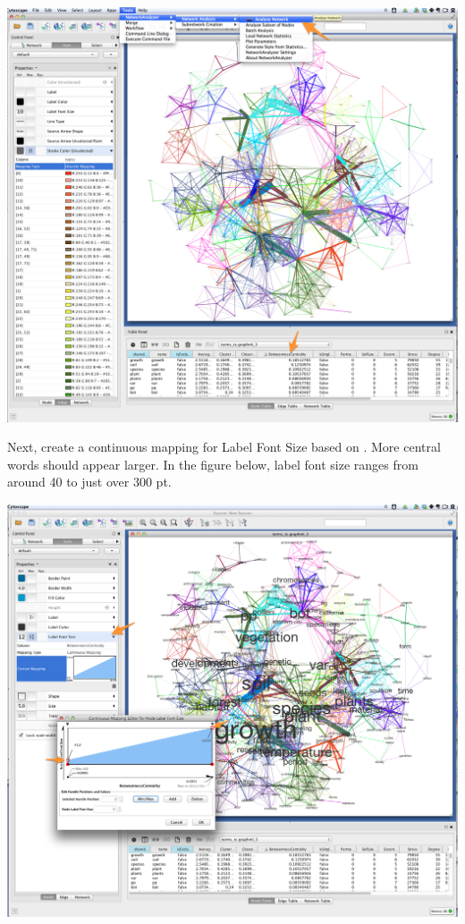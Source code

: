 \documentclass[letterpaper,10pt,english]{sphinxmanual}
\begin{document}
{\hfill\includegraphics{cytoscape3.png}\hfill}

Next, create a continuous mapping for Label Font Size based on .
More central words should appear larger. In the figure below, label font size ranges from
around 40 to just over 300 pt.

{\hfill\includegraphics{cytoscape4.png}\hfill}
\end{document}

